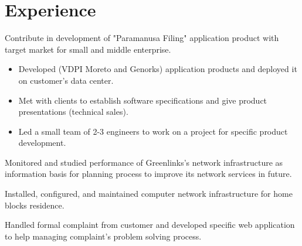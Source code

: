 \documentclass[10pt, a4paper]{moderncv}
\begin{document}
\section{Experience}
{
    \begin{scriptsize}
        Contribute in development of "Paramanusa Filing" application product with target market for small and middle enterprise.
    \end{scriptsize}
}
{
    \begin{itemize}
        \item Developed (VDPI Moreto and Genorks) application products and deployed it on customer's data center.
        \item Met with clients to establish software specifications and give product presentations (technical sales).
        \item Led a small team of 2-3 engineers to work on a project for specific product development.
    \end{itemize}
}
{
    \begin{scriptsize}
        Monitored and studied performance of Greenlinks's network infrastructure as information basis for planning process to improve its network services in future.
    \end{scriptsize}
}
{
    \begin{scriptsize}
        Installed, configured, and maintained computer network infrastructure for home blocks residence.
    \end{scriptsize}
}
{
    \begin{scriptsize}
        Handled formal complaint from customer and developed specific web application to help managing complaint's problem solving process.
    \end{scriptsize}
}
\end{document}

